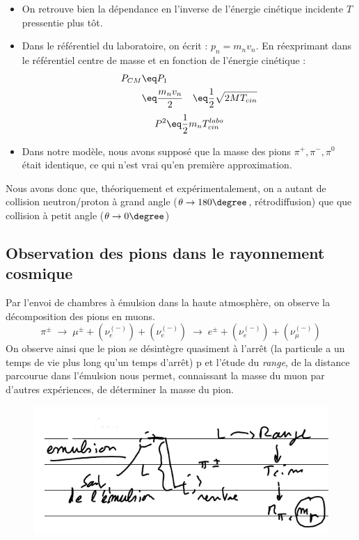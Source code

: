 \begin{itemize}[label = $\bullet$]
    \item On retrouve bien la dépendance en l'inverse de l'énergie cinétique incidente $T$ pressentie plus tôt.
    \item Dans le référentiel du laboratoire, on écrit : $p_n = m_n v_n$. En réexprimant dans le référentiel centre de masse et en fonction de l'énergie cinétique :
    \begin{align*}
        P_{CM} & \eq P_1\\
        &\eq \frac{m_n v_n}{2}
        & \eq\frac{1}{2}\sqrt{2M T_{cin}}
    \end{align*}
    \begin{equation*}
        P^2 \eq \frac{1}{2}m_n T_{cin}^{labo}
    \end{equation*}
    \item Dans notre modèle, nous avons supposé que la masse des pions $\pi^+,\pi^-,\pi^0$ était identique, ce qui n'est vrai qu'en première approximation.
\end{itemize}
Nous avons donc que, théoriquement et expérimentalement, on a autant de collision neutron/proton à grand angle ($\theta \rightarrow 180\degree$, rétrodiffusion) que que collision à petit angle ($\theta \rightarrow 0\degree$) 


\subsection{Observation des pions dans le rayonnement cosmique}


Par l'envoi de chambres à émulsion dans la haute atmosphère, on observe la décomposition des pions en muons. 
\begin{equation*}
    \pi^\pm \; \longrightarrow \; \mu^\pm +(\nu^{(-)}_e) + (\nu^{(-)}_e)\; \longrightarrow \; e^\pm  + (\nu_e^{(-)})  + (\nu_\mu^{(-)})
\end{equation*}
On observe ainsi que le pion se désintègre quasiment à l'arrêt (la particule a un temps de vie plus long qu'un temps d'arrêt)   p et l'étude du \emph{range}, de la distance parcourue dans l'émulsion nous permet, connaissant la masse du muon par d'autres expériences, de déterminer la masse du pion.\\


\begin{figure}[H]
    \centering
    \includegraphics{Images4/masse_pion.PNG}
\end{figure}

